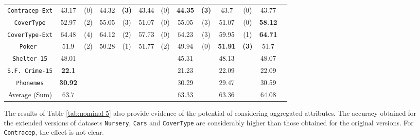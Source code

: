 \begin{table*}[t]
\begin{tabular}{c|cc|cc|cc|cc|cc|cc}
{\tt Contracep-Ext} & 43.17    & (0)    & 44.32    &{\bf(3)}& 43.44    & (0)    &{\bf44.35}&{\bf(3)}& 43.7     & (0)    & 43.77    &        \\
{\tt CoverType}     & 52.97    & (2)    & 55.05    & (3)    & 51.07    & (0)    & 55.05    & (3)    & 51.07    & (0)    &{\bf58.12}&        \\
{\tt CoverType-Ext} & 64.48    & (4)    & 64.12    & (2)    & 57.73    & (0)    & 64.23    & (3)    & 59.95    & (1)    &{\bf64.71}&        \\ 
{\tt Poker }        & 51.9     & (2)    & 50.28    & (1)    & 51.77    & (2)    & 49.94    & (0)    &{\bf51.91}&{\bf(3)}& 51.7     &        \\ 
{\tt Shelter-15}    & 48.01    &        &          &        &          &        & 45.31    &        & 48.13    &        & 48.07    &        \\   
{\tt S.F. Crime-15} &{\bf22.1} &        &          &        &          &        & 21.23    &        & 22.09    &        & 22.09    &        \\ 
{\tt Phonemes}      &{\bf30.92}&        &          &        &          &        & 30.29    &        & 29.47    &        & 30.59    &        \\
\hline
Average (Sum)       &     63.7 &        &          &        &          &        & 63.33    &        & 63.36    &        & 64.08    & 

\end{tabular}
\label{tab:nominal-5}
\normalsize
\end{table*}


The results of  Table \ref{tab:nominal-5} also
provide evidence of  the potential
of considering aggregated attributes. 
The accuracy obtained for the extended versions of datasets
{\tt Nursery}, {\tt Cars} and {\tt CoverType} are considerably higher than those obtained for 
the original versions. For {\tt Contracep}, the effect is not clear.

